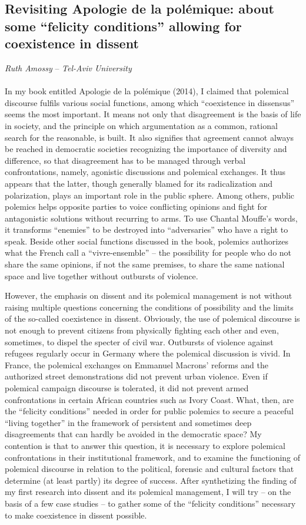 \subsection*{Revisiting Apologie de la polémique: about some “felicity conditions” allowing for coexistence in dissent}
\emph{Ruth Amossy} -- \emph{Tel-Aviv University}
\\\\
In my book entitled Apologie de la polémique (2014), I claimed that polemical discourse fulfils various social functions, among which “coexistence in dissensus” seems the most important. It means not only that disagreement is the basis of life in society, and the principle on which argumentation as a common, rational search for the reasonable, is built. It also signifies that agreement cannot always be reached in democratic societies recognizing the importance of diversity and difference, so that disagreement has to be managed through verbal confrontations, namely, agonistic discussions and polemical exchanges. It thus appears that the latter, though generally blamed for its radicalization and polarization, plays an important role in the public sphere. Among others, public polemics helps opposite parties to voice conflicting opinions and fight for antagonistic solutions without recurring to arms. To use Chantal Mouffe’s words, it transforms “enemies” to be destroyed into “adversaries” who have a right to speak. Beside other social functions discussed in the book, polemics authorizes what the French call a “vivre-ensemble” – the possibility for people who do not share the same opinions, if not the same premises, to share the same national space and live together without outbursts of violence.

However, the emphasis on dissent and its polemical management is not without raising multiple questions concerning the conditions of possibility and the limits of the so-called coexistence in dissent. Obviously, the use of polemical discourse is not enough to prevent citizens from physically fighting each other and even, sometimes, to dispel the specter of civil war. Outbursts of violence against refugees regularly occur in Germany where the polemical discussion is vivid. In France, the polemical exchanges on Emmanuel Macrons’ reforms and the authorized street demonstrations did not prevent urban violence. Even if polemical campaign discourse is tolerated, it did not prevent armed confrontations in certain African countries such as Ivory Coast. What, then, are the “felicity conditions” needed in order for public polemics to secure a peaceful “living together” in the framework of persistent and sometimes deep disagreements that can hardly be avoided in the democratic space? My contention is that to answer this question, it is necessary to explore polemical confrontations in their institutional framework, and to examine the functioning of polemical discourse in relation to the political, forensic and cultural factors that determine (at least partly) its degree of success. After synthetizing the finding of my first research into dissent and its polemical management, I will try – on the basis of a few case studies – to gather some of the “felicity conditions” necessary to make coexistence in dissent possible.

